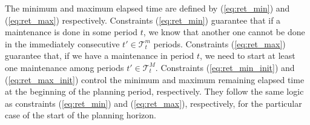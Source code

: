 \documentclass[a4paper,onecolumn,fleqn]{article}
\begin{document}
    The minimum and maximum elapsed time are defined by (\ref{eq:ret_min}) and (\ref{eq:ret_max}) respectively. Constraints (\ref{eq:ret_min}) guarantee that if a maintenance is done in some period $t$, we know that another one cannot be done in the immediately consecutive $t' \in \mathcal{T}^{m}_t$ periods. Constraints (\ref{eq:ret_max}) guarantee that, if we have a maintenance in period $t$, we need to start at least one maintenance among periods $t' \in \mathcal{T}^{M}_t$. Constraints (\ref{eq:ret_min_init}) and (\ref{eq:ret_max_init}) control the minimum and maximum remaining elapsed time at the beginning of the planning period, respectively. They follow the same logic as constraints (\ref{eq:ret_min}) and (\ref{eq:ret_max}), respectively, for the particular case of the start of the planning horizon.

\end{document}
